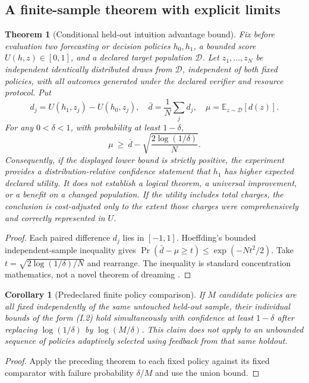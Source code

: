\documentclass[11pt,letterpaper]{article}
\theoremstyle{definition}
\theoremstyle{plain}
\newtheorem{theorem}[definition]{Theorem}
\newtheorem{corollary}[definition]{Corollary}
\theoremstyle{definition}
\begin{document}
\subsection{A finite-sample theorem with explicit limits}
\begin{theorem}[Conditional held-out intuition advantage bound]
\label{thm:intuition-bound}
Fix before evaluation two forecasting or decision policies $h_0,h_1$, a
bounded score $U(h,z)\in[0,1]$, and a declared target population
$\mathcal D$. Let $z_1,\ldots,z_N$ be independent identically distributed
draws from $\mathcal D$, independent of both fixed policies, with all
outcomes generated under the declared verifier and resource protocol. Put
\[
 d_j=U(h_1,z_j)-U(h_0,z_j),\quad
 \bar d=\frac1N\sum_j d_j,\quad \mu=\mathbb E_{z\sim\mathcal D}[d(z)].
\]
For any $0<\delta<1$, with probability at least $1-\delta$,
\[
 \mu\ \geq\ \bar d-\sqrt{\frac{2\log(1/\delta)}{N}}.
 \tag{I.2}
\]
Consequently, if the displayed lower bound is strictly positive, the
experiment provides a distribution-relative confidence statement that
$h_1$ has higher expected declared utility. It does \emph{not} establish a
logical theorem, a universal improvement, or a benefit on a changed
population. If the utility includes total charges, the conclusion is
cost-adjusted only to the extent those charges were comprehensively and
correctly represented in $U$.
\end{theorem}
\begin{proof}
Each paired difference $d_j$ lies in $[-1,1]$. Hoeffding's bounded
independent-sample inequality gives
$\Pr(\bar d-\mu\ge t)\le\exp(-Nt^2/2)$.
Take $t=\sqrt{2\log(1/\delta)/N}$ and rearrange.
The inequality is standard concentration mathematics, not a novel theorem
of dreaming \cite{hoeffding}.
\end{proof}

\begin{corollary}[Predeclared finite policy comparison]
If $M$ candidate policies are all fixed independently of the same untouched
held-out sample, their individual bounds of the form (I.2) hold
simultaneously with confidence at least $1-\delta$ after replacing
$\log(1/\delta)$ by $\log(M/\delta)$. This claim does not apply to an
unbounded sequence of policies adaptively selected using feedback from
that same holdout.
\end{corollary}
\begin{proof}Apply the preceding theorem to each fixed policy against its
fixed comparator with failure probability $\delta/M$ and use the union
bound.\end{proof}
\end{document}
